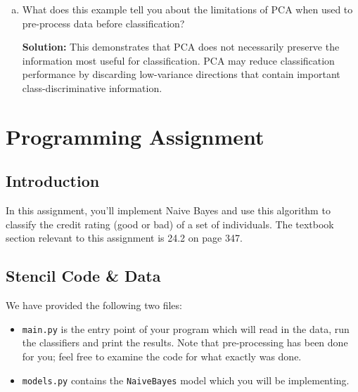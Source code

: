 \documentclass{article}
\begin{document}
\begin{enumerate}[a.]
    Since the black points generally lie above and to the left of the white points, they tend to have larger values of $x_2-x_1$, while the white tend to have smaller values. Therefore, the projected values can be approximately separated by a threshold $t$:

    \[
    h(z)=
    \begin{cases}
    1, & z\geq t,\\
    0, & z<t.
    \end{cases}
    \]


    \item What does this example tell you about the limitations of PCA when used to pre-process data before classification?

    \textbf{Solution:} This demonstrates that PCA does not necessarily preserve the information most useful for classification. PCA may reduce classification performance by discarding low-variance directions that contain important class-discriminative information.

\end{enumerate}

\newpage

\section*{\LARGE Programming Assignment}

\subsection*{Introduction}
In this assignment, you'll implement Naive Bayes and use this algorithm to classify the credit rating (good or bad) of a set of individuals. The textbook section relevant to this assignment is 24.2 on page 347.


\subsection*{Stencil Code \& Data}


We have provided the following two files:
\begin{itemize}
	\item \texttt{main.py} is the entry point of your program which will read in the data, run the classifiers and print the results. Note that pre-processing has been done for you; feel free to examine the code for what exactly was done.
	\item \texttt{models.py} contains the \texttt{NaiveBayes} model which you will be implementing.
\end{itemize}
\end{document}
